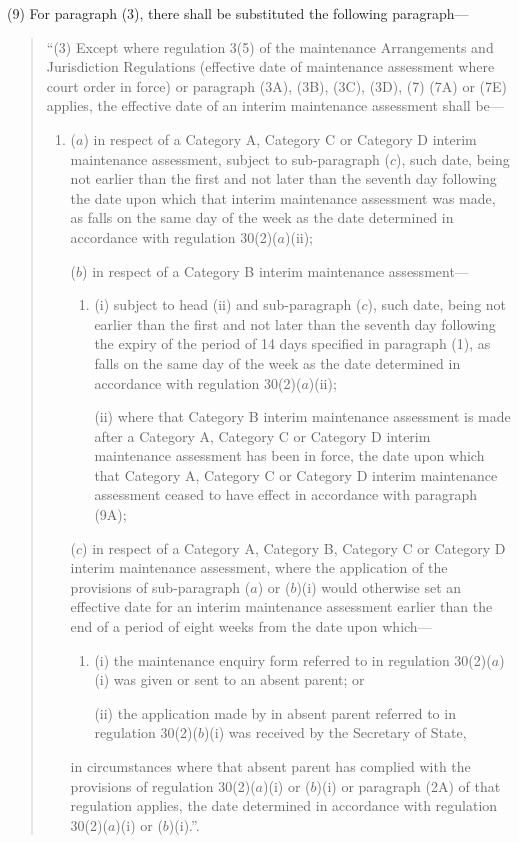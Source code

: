 \documentclass[12pt,a4paper]{article}
\begin{document}
(9) For paragraph (3), there shall be substituted the following paragraph—
\begin{quotation}
“(3) Except where regulation 3(5) of the maintenance Arrangements and Jurisdiction Regulations (effective date of maintenance assessment where court order in force) or paragraph (3A), (3B), (3C), (3D), (7) (7A) or (7E) applies, the effective date of an interim maintenance assessment shall be—
\begin{enumerate}\item[]
($a$) in respect of a Category A, Category C or Category D interim maintenance assessment, subject to sub-paragraph ($c$), such date, being not earlier than the first and not later than the seventh day following the date upon which that interim maintenance assessment was made, as falls on the same day of the week as the date determined in accordance with regulation 30(2)($a$)(ii);

($b$) in respect of a Category B interim maintenance assessment—
\begin{enumerate}\item[]
(i) subject to head (ii) and sub-paragraph ($c$), such date, being not earlier than the first and not later than the seventh day following the expiry of the period of 14 days specified in paragraph (1), as falls on the same day of the week as the date determined in accordance with regulation 30(2)($a$)(ii);

(ii) where that Category B interim maintenance assessment is made after a Category A, Category C or Category D interim maintenance assessment has been in force, the date upon which that Category A, Category C or Category D interim maintenance assessment ceased to have effect in accordance with paragraph (9A);
\end{enumerate}

($c$) in respect of a Category A, Category B, Category C or Category D interim maintenance assessment, where the application of the provisions of sub-paragraph ($a$) or ($b$)(i) would otherwise set an effective date for an interim maintenance assessment earlier than the end of a period of eight weeks from the date upon which—
\begin{enumerate}\item[]
(i) the maintenance enquiry form referred to in regulation 30(2)($a$)(i) was given or sent to an absent parent; or

(ii) the application made by in absent parent referred to in regulation 30(2)($b$)(i) was received by the Secretary of State,
\end{enumerate}
in circumstances where that absent parent has complied with the provisions of regulation 30(2)($a$)(i) or ($b$)(i) or paragraph (2A) of that regulation applies, the date determined in accordance with regulation 30(2)($a$)(i) or ($b$)(i).”.
\end{enumerate}
\end{quotation}
\end{document}

